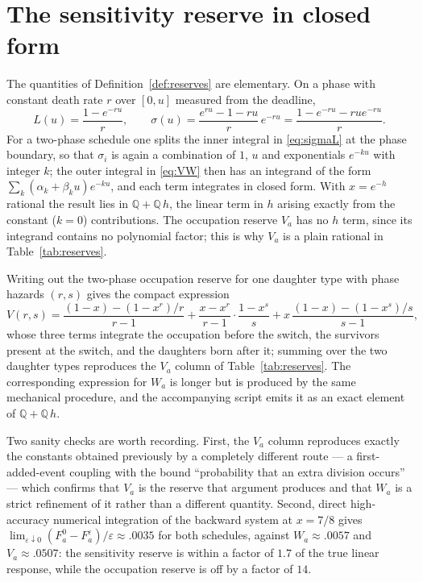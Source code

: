 \documentclass[11pt]{article}
\theoremstyle{plain}
\theoremstyle{definition}
\theoremstyle{remark}
\newcommand{\eps}{\varepsilon}
\begin{document}
\section{The sensitivity reserve in closed form}\label{app:reserve}

The quantities of Definition~\ref{def:reserves} are elementary. On a phase with
constant death rate $r$ over $[0,u]$ measured from the deadline,
\[
 L(u)=\frac{1-e^{-ru}}{r},\qquad
 \sigma(u)=\frac{e^{ru}-1-ru}{r}\,e^{-ru}=\frac{1-e^{-ru}-rue^{-ru}}{r} .
\]
For a two-phase schedule one splits the inner integral in \eqref{eq:sigmaL} at
the phase boundary, so that $\sigma_i$ is again a combination of $1$, $u$ and
exponentials $e^{-ku}$ with integer $k$; the outer integral in \eqref{eq:VW}
then has an integrand of the form $\sum_k(\alpha_k+\beta_ku)e^{-ku}$, and each
term integrates in closed form. With $x=e^{-h}$ rational the result lies in
$\mathbb Q+\mathbb Q\,h$, the linear term in $h$ arising exactly from the
constant ($k=0$) contributions. The occupation reserve $V_a$ has no $h$ term,
since its integrand contains no polynomial factor; this is why $V_a$ is a plain
rational in Table~\ref{tab:reserves}.

Writing out the two-phase occupation reserve for one daughter type with phase
hazards $(r,s)$ gives the compact expression
\[
 V(r,s)=\frac{(1-x)-(1-x^r)/r}{r-1}
 +\frac{x-x^r}{r-1}\cdot\frac{1-x^s}{s}
 +x\,\frac{(1-x)-(1-x^s)/s}{s-1},
\]
whose three terms integrate the occupation before the switch, the survivors
present at the switch, and the daughters born after it; summing over the two
daughter types reproduces the $V_a$ column of Table~\ref{tab:reserves}. The
corresponding expression for $W_a$ is longer but is produced by the same
mechanical procedure, and the accompanying script emits it as an exact element
of $\mathbb Q+\mathbb Q\,h$.

Two sanity checks are worth recording. First, the $V_a$ column reproduces
exactly the constants obtained previously by a completely different route --- a
first-added-event coupling with the bound ``probability that an extra division
occurs'' --- which confirms that $V_a$ is the reserve that argument produces
and that $W_a$ is a strict refinement of it rather than a different quantity.
Second, direct high-accuracy numerical integration of the backward system at
$x=7/8$ gives $\lim_{\eps\downarrow0}(F^0_a-F^{\eps}_a)/\eps\approx.0035$ for
both schedules, against $W_a\approx.0057$ and $V_a\approx.0507$: the sensitivity
reserve is within a factor of $1.7$ of the true linear response, while the
occupation reserve is off by a factor of $14$.
\end{document}
